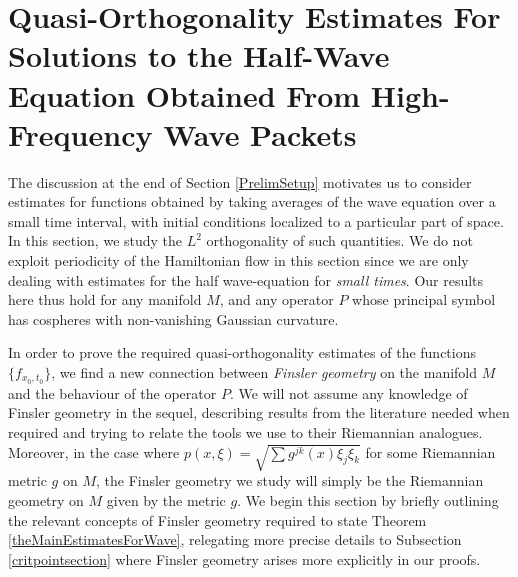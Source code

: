 \section{Quasi-Orthogonality Estimates For Solutions to the Half-Wave Equation Obtained From High-Frequency Wave Packets} \label{estimatesforwavepackets}

The discussion at the end of Section \ref{PrelimSetup} motivates us to consider estimates for functions obtained by taking averages of the wave equation over a small time interval, with initial conditions localized to a particular part of space. In this section, we study the $L^2$ orthogonality of such quantities. We do not exploit periodicity of the Hamiltonian flow in this section since we are only dealing with estimates for the half wave-equation for \emph{small times}. Our results here thus hold for any manifold $M$, and any operator $P$ whose principal symbol has cospheres with non-vanishing Gaussian curvature.

In order to prove the required quasi-orthogonality estimates of the functions $\{ f_{x_0,t_0} \}$, we find a new connection between \emph{Finsler geometry} on the manifold $M$ and the behaviour of the operator $P$. We will not assume any knowledge of Finsler geometry in the sequel, describing results from the literature needed when required and trying to relate the tools we use to their Riemannian analogues. Moreover, in the case where $p(x,\xi) = \sqrt{\sum g^{jk}(x) \xi_j \xi_k}$ for some Riemannian metric $g$ on $M$, the Finsler geometry we study will simply be the Riemannian geometry on $M$ given by the metric $g$. We begin this section by briefly outlining the relevant concepts of Finsler geometry required to state Theorem \ref{theMainEstimatesForWave}, relegating more precise details to Subsection \ref{critpointsection} where Finsler geometry arises more explicitly in our proofs.


